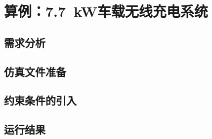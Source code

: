 \documentclass[index]{subfiles}
\begin{document}
\chapter{算例：\SI{7.7}{\kilo\watt}车载无线充电系统}
\section{需求分析}
\section{仿真文件准备}
\section{约束条件的引入}
\section{运行结果}
\end{document}

